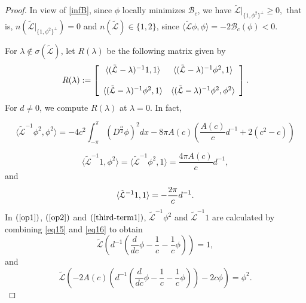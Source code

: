 \documentclass[12pt,reqno]{amsart}
\newcommand{\2}{L^2_{per}(0, T)}
\numberwithin{equation}{section}
\numberwithin{figure}{section}
\begin{document}
\begin{proof}
	In view of \eqref{infB}, since $\phi$ locally minimizes $\mathcal{B}_c$, we have
	$
	\mathcal{\tilde{L}}|_{\{1, \phi^2\}^\bot} \geq 0,
	$
	that is, $n(\mathcal{\tilde{L}}|_{\{1, \phi^2\}^\bot}) = 0$ and $n(\mathcal{\tilde{L}})\in\{1,2\}$, since $\langle\mathcal{\tilde{L}}\phi,\phi\rangle=-2\mathcal{B}_c(\phi)<0$.
	
	For $\lambda\notin \sigma(\mathcal{\tilde{L}})$, let $R(\lambda)$ be the following matrix given by
	\begin{equation} R(\lambda) :=
		\left[
		\begin{array}{c c }
			\langle (\mathcal{\tilde{L}}-\lambda)^{-1}1, 1 \rangle &  \langle (\mathcal{\tilde{L}}-\lambda)^{-1}\phi^2, 1 \rangle \\
			& \\
			\langle (\mathcal{\tilde{L}}-\lambda)^{-1}\phi^2, 1 \rangle & \langle (\mathcal{\tilde{L}}-\lambda)^{-1}\phi^2, \phi^2 \rangle
		\end{array}\right].
	\end{equation}
For $d\neq0$, we compute $R(\lambda)$ at $\lambda=0$. In fact,

\begin{equation}\label{op1}
\langle \mathcal{\tilde{L}}^{-1}\phi^2, \phi^2 \rangle	=	\displaystyle - 4c^2 \int_{-\pi}^{\pi} (D^{\frac{\alpha}{2}}\phi)^2 dx -8\pi A(c)\left( \frac{A(c)}{c}d^{-1} + 2(c^2-c) \right)
\end{equation}

	\begin{equation}\label{op2}
	\langle \mathcal{\tilde{L}}^{-1}1, \phi^2 \rangle=\langle \mathcal{\tilde{L}}^{-1}\phi^2, 1 \rangle=\frac{4\pi A(c)}{c}d^{-1},
	\end{equation}
and 	\begin{equation}\label{third-term1}\langle\mathcal{\tilde{L}}^{-1}1, 1 \rangle=\displaystyle
	\displaystyle -\frac{2 \pi }{c}d^{-1}.
	\end{equation}
In $(\ref{op1})$, $(\ref{op2})$ and $(\ref{third-term1})$, $\mathcal{\tilde{L}}^{-1}\phi^2$ and $\mathcal{\tilde{L}}^{-1}1$ are calculated by combining \eqref{eq15} and \eqref{eq16} to obtain
	\begin{equation}\label{eqmatrix}
	\mathcal{\tilde{L}} \left(d^{-1} \left( \frac{d}{dc}\phi - \frac{1}{c} - \frac{1}{c}\phi \right) \right) = 1,
	\end{equation}
	and
	\begin{equation}\label{eqmatrix2}
	\mathcal{\tilde{L}} \left(-2A(c) \left( d^{-1}\left( \frac{d}{dc}\phi -\frac{1}{c} -\frac{1}{c}\phi\right) \right) - 2c\phi \right) = \phi^2.
	\end{equation}
	

\end{proof}
\end{document}
